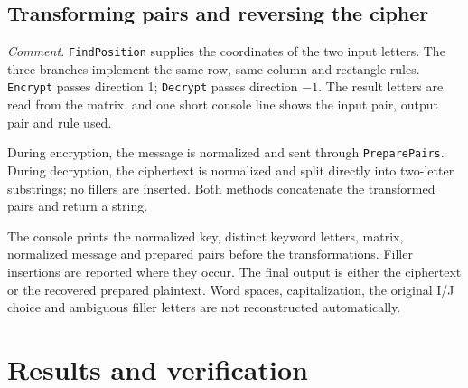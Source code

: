 \documentclass{tum_report}
\newcommand{\codepart}[2]{{\setstretch{1}}}
\begin{document}
\clearpage
\section{Transforming pairs and reversing the cipher}
\codepart{196}{225}
\noindent\textit{Comment.} \texttt{FindPosition} supplies the coordinates
of the two input letters. The three branches implement the same-row,
same-column and rectangle rules. \texttt{Encrypt} passes direction 1;
\texttt{Decrypt} passes direction $-1$. The result letters are read from
the matrix, and one short console line shows the input pair, output pair
and rule used.

During encryption, the message is normalized and sent through
\texttt{PreparePairs}. During decryption, the ciphertext is normalized and
split directly into two-letter substrings; no fillers are inserted.
Both methods concatenate the transformed pairs and return a string.

The console prints the normalized key, distinct keyword letters, matrix,
normalized message and prepared pairs before the transformations. Filler
insertions are reported where they occur. The final output is either the
ciphertext or the recovered prepared plaintext. Word spaces, capitalization,
the original I/J choice and ambiguous filler letters are not reconstructed
automatically.

\clearpage
\chapter{Results and verification}
\end{document}
